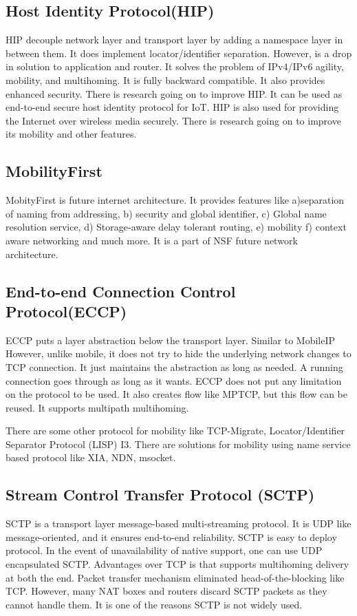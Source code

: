 \subsection{Host Identity Protocol(HIP)}
HIP\cite{HIP} decouple network layer and transport layer by adding a namespace layer in between them. It does implement locator/identifier separation. However, is a drop in solution to application and router. It solves the problem of IPv4/IPv6 agility, mobility, and multihoming. It is fully backward compatible. It also provides enhanced security. There is research going on to improve HIP. It can be used as end-to-end secure host identity protocol for IoT\cite{HIPIoT}. HIP is also used for providing the Internet over wireless media securely\cite{HIPPubliceWifi}. There is research going on to improve its mobility and other features\cite{HIPMobility,HIPMobilityEnhanced,HIPMobilitySimulte}.

\subsection{MobilityFirst}
MobityFirst is future internet architecture. It provides features like a)separation of naming from addressing, b) security and global identifier, c) Global name resolution service, d) Storage-aware delay tolerant routing, e) mobility f) context aware networking\cite{MobilityFirstContextAwareDemo} and much more. It is a part of NSF future network architecture.


\subsection{End-to-end Connection Control Protocol(ECCP)}
ECCP\cite{ECCP} puts a layer abstraction below the transport layer. Similar to MobileIP However, unlike mobile, it does not try to hide the underlying network changes to TCP connection. It just maintains the abstraction as long as needed. A running connection goes through as long as it wants. ECCP does not put any limitation on the protocol to be used. It also creates flow like MPTCP, but this flow can be reused. It supports multipath multihoming. 

There are some other protocol for mobility like TCP-Migrate, Locator/Identifier Separator Protocol (LISP)\cite{LISPRFC6830} I3\cite{I3-internet-indirection-infrastructure}. There are solutions for mobility using name service based protocol like XIA\cite{XIA}, NDN\cite{ndn}, msocket\cite{Yadav2016}.

\subsection{Stream Control Transfer Protocol (SCTP)}
SCTP\cite{RFC4960} is a transport layer message-based multi-streaming protocol. It is UDP like message-oriented, and it ensures end-to-end reliability. SCTP is easy to deploy protocol. In the event of unavailability of native support, one can use UDP encapsulated SCTP\cite{RFC6951}. Advantages over TCP is that supports multihoming delivery at both the end. Packet transfer mechanism eliminated head-of-the-blocking like TCP. However, many NAT boxes and routers discard SCTP packets as they cannot handle them. It is one of the reasons SCTP is not widely used.

